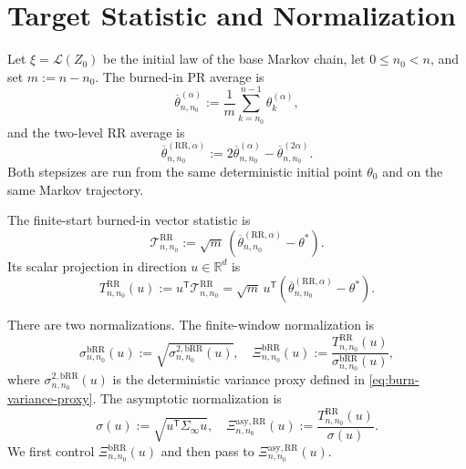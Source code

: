 
\section{Target Statistic and Normalization}

Let $\xi = \mathcal{L}(Z_{0})$ be the initial law of the base Markov chain, let
$0 \le n_{0} < n$, and set $m := n - n_{0}$. The burned-in PR average is
\[
\overline{\theta}_{n,n_{0}}^{(\alpha)}
  := \frac{1}{m} \sum_{k = n_{0}}^{n - 1} \theta_{k}^{(\alpha)},
\]
and the two-level RR average is
\begin{equation}
\overline{\theta}_{n,n_{0}}^{(\mathrm{RR}, \alpha)}
  := 2 \overline{\theta}_{n,n_{0}}^{(\alpha)}
     - \overline{\theta}_{n,n_{0}}^{(2 \alpha)}.
\label{eq:burn-rr-average}
\end{equation}
Both stepsizes are run from the same deterministic initial point $\theta_{0}$ and
on the same Markov trajectory.

The finite-start burned-in vector statistic is
\begin{equation}
\mathcal{T}_{n,n_{0}}^{\mathrm{RR}}
  := \sqrt{m} \, \left( \overline{\theta}_{n,n_{0}}^{(\mathrm{RR}, \alpha)} - \theta^{*} \right).
\label{eq:burn-vector-target}
\end{equation}
Its scalar projection in direction $u \in \mathbb{R}^{d}$ is
\begin{equation}
T_{n,n_{0}}^{\mathrm{RR}}(u)
  := u^{\mathsf{T}} \mathcal{T}_{n,n_{0}}^{\mathrm{RR}}
  = \sqrt{m} \, u^{\mathsf{T}} \left( \overline{\theta}_{n,n_{0}}^{(\mathrm{RR}, \alpha)} - \theta^{*} \right).
\label{eq:burn-target}
\end{equation}

There are two normalizations. The finite-window normalization is
\begin{equation}
\sigma_{n,n_{0}}^{\mathrm{bRR}}(u)
  := \sqrt{\sigma_{n,n_{0}}^{2, \mathrm{bRR}}(u)},
\quad
\Xi_{n,n_{0}}^{\mathrm{bRR}}(u)
  := \frac{T_{n,n_{0}}^{\mathrm{RR}}(u)}{\sigma_{n,n_{0}}^{\mathrm{bRR}}(u)},
\label{eq:burn-finite-normalization}
\end{equation}
where $\sigma_{n,n_{0}}^{2, \mathrm{bRR}}(u)$ is the deterministic variance proxy
defined in \eqref{eq:burn-variance-proxy}. The asymptotic normalization is
\begin{equation}
\sigma(u) := \sqrt{u^{\mathsf{T}} \Sigma_{\infty} u},
\quad
\Xi_{n,n_{0}}^{\mathrm{asy,RR}}(u)
  := \frac{T_{n,n_{0}}^{\mathrm{RR}}(u)}{\sigma(u)}.
\label{eq:burn-asymptotic-normalization}
\end{equation}
We first control $\Xi_{n,n_{0}}^{\mathrm{bRR}}(u)$ and then pass to
$\Xi_{n,n_{0}}^{\mathrm{asy,RR}}(u)$.
